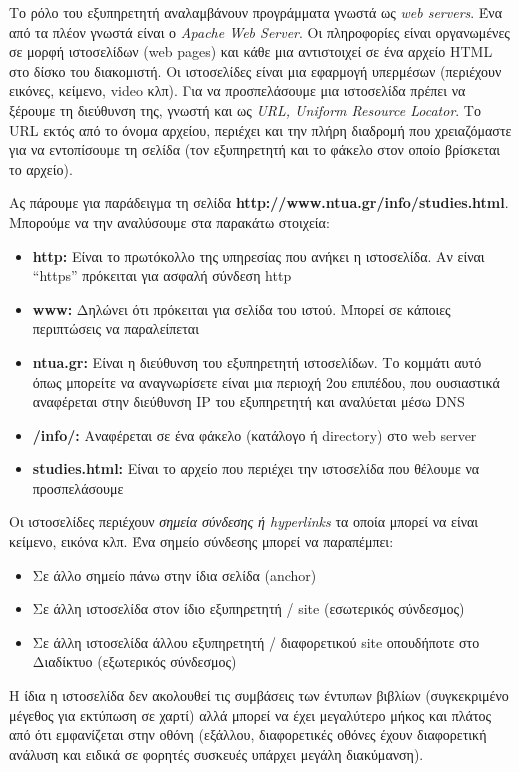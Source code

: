 Το ρόλο του εξυπηρετητή αναλαμβάνουν προγράμματα γνωστά ως \emph{web servers}. Ένα από τα πλέον γνωστά είναι ο \emph{Apache Web Server}. Οι πληροφορίες είναι οργανωμένες σε μορφή ιστοσελίδων (web pages) και κάθε μια αντιστοιχεί σε ένα αρχείο HTML στο δίσκο του διακομιστή. Οι ιστοσελίδες είναι μια εφαρμογή υπερμέσων (περιέχουν εικόνες, κείμενο, video κλπ). Για να προσπελάσουμε μια ιστοσελίδα πρέπει να ξέρουμε τη διεύθυνση της, γνωστή και ως \emph{URL, Uniform Resource Locator}. Το URL εκτός από το όνομα αρχείου, περιέχει και την πλήρη διαδρομή που χρειαζόμαστε για να εντοπίσουμε τη σελίδα (τον εξυπηρετητή και το φάκελο στον οποίο βρίσκεται το αρχείο).

Ας πάρουμε για παράδειγμα τη σελίδα \textbf{http://www.ntua.gr/info/studies.html}. Μπορούμε να την αναλύσουμε στα παρακάτω στοιχεία:

\begin{itemize}
\item \textbf{http:} Είναι το πρωτόκολλο της υπηρεσίας που ανήκει η ιστοσελίδα. Αν είναι ``https'' πρόκειται για ασφαλή σύνδεση http
\item \textbf{www:} Δηλώνει ότι πρόκειται για σελίδα του ιστού. Μπορεί σε κάποιες περιπτώσεις να παραλείπεται
\item \textbf{ntua.gr:} Είναι η διεύθυνση του εξυπηρετητή ιστοσελίδων. Το κομμάτι αυτό όπως μπορείτε να αναγνωρίσετε είναι μια περιοχή 2ου επιπέδου, που ουσιαστικά αναφέρεται στην διεύθυνση IP του εξυπηρετητή και αναλύεται μέσω DNS
\item \textbf{/info/:} Αναφέρεται σε ένα φάκελο (κατάλογο ή directory) στο web server
\item \textbf{studies.html:} Είναι το αρχείο που περιέχει την ιστοσελίδα που θέλουμε να προσπελάσουμε
\end{itemize}

Οι ιστοσελίδες περιέχουν \emph{σημεία σύνδεσης ή hyperlinks} τα οποία μπορεί να είναι κείμενο, εικόνα κλπ. Ένα σημείο σύνδεσης μπορεί να παραπέμπει:

\begin{itemize}
\item Σε άλλο σημείο πάνω στην ίδια σελίδα (anchor)
\item Σε άλλη ιστοσελίδα στον ίδιο εξυπηρετητή / site (εσωτερικός σύνδεσμος)
\item Σε άλλη ιστοσελίδα άλλου εξυπηρετητή / διαφορετικού site οπουδήποτε στο Διαδίκτυο (εξωτερικός σύνδεσμος)
\end{itemize}

Η ίδια η ιστοσελίδα δεν ακολουθεί τις συμβάσεις των έντυπων βιβλίων (συγκεκριμένο μέγεθος για εκτύπωση σε χαρτί) αλλά μπορεί να έχει μεγαλύτερο μήκος και πλάτος από ότι εμφανίζεται στην οθόνη (εξάλλου, διαφορετικές οθόνες έχουν διαφορετική ανάλυση και ειδικά σε φορητές συσκευές υπάρχει μεγάλη διακύμανση).


